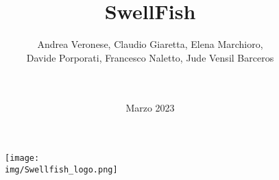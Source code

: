 \documentclass[12pt]{article}
\begin{document}
\title{SwellFish}
\begin{figure}
\centering
\texttt{[image: \\img/Swellfish\_logo.png]}
\end{figure}
\author{Andrea Veronese, Claudio Giaretta, Elena Marchioro,\\
Davide Porporati, Francesco Naletto, Jude Vensil Barceros \\ \\
 \href{swellfish14@gmail.com}{} \\
} 
\date{Marzo 2023}



\maketitle
\end{document}
